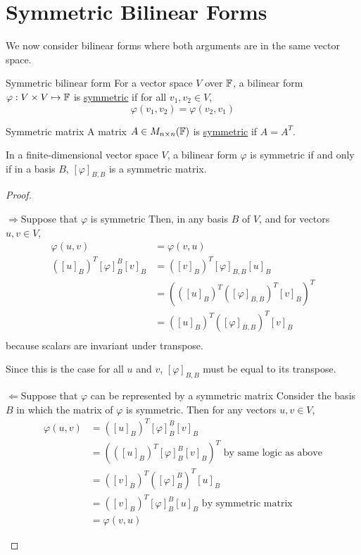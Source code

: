 \documentclass[../Main.tex]{subfiles}
\begin{document}
\section{Symmetric Bilinear Forms}
We now consider bilinear forms where both arguments are in the same vector space.
\begin{definition}{Symmetric bilinear form}
    For a vector space $V$ over $\mathbb{F}$, a bilinear form $\varphi : V \times V \mapsto \mathbb{F}$ is \underline{symmetric} if for all $v_1, v_2 \in V$,
    \begin{equation*}
        \varphi(v_1, v_2) = \varphi(v_2, v_1)
    \end{equation*}
\end{definition}
\begin{definition}{Symmetric matrix}
    A matrix $A \in M_{n \times n}(\mathbb{F})$ is \underline{symmetric} if $A = A^T$.
\end{definition}
\begin{proposition}
    In a finite-dimensional vector space $V$, a bilinear form $\varphi$ is symmetric if and only if in a basis $B$, $[\varphi]_{B, B}$ is a symmetric matrix.
    \label{propSymMatrixIffBF}
\end{proposition}
\begin{proof}
    \begin{proofdirection}{$\Rightarrow$}{Suppose that $\varphi$ is symmetric}
        Then, in any basis $B$ of $V$, and for vectors $u, v \in V$,
        \begin{align*}
            \varphi(u, v) &= \varphi(v, u) \\
            \left([u]_B\right)^T [\varphi]_B^B [v]_B &= \left([v]_B\right)^T [\varphi]_{B, B} [u]_B \\
            &= \left(\left([u]_B\right)^T \left([\varphi]_{B, B}\right)^T [v]_B\right)^T \\
            &= \left([u]_B\right)^T \left([\varphi]_{B, B}\right)^T [v]_B \\
        \end{align*}
        because scalars are invariant under transpose.

        Since this is the case for all $u$ and $v$, $[\varphi]_{B, B}$ must be equal to its transpose.
    \end{proofdirection}
    \begin{proofdirection}{$\Leftarrow$}{Suppose that $\varphi$ can be represented by a symmetric matrix}
        Consider the basis $B$ in which the matrix of $\varphi$ is symmetric. Then for any vectors $u, v \in V$,
        \begin{align*}
            \varphi(u, v) &=\left([u]_B\right)^T [\varphi]_B^B [v]_B  \\
            &= \left(\left([u]_B\right)^T [\varphi]_B^B [v]_B\right)^T \text{ by same logic as above} \\
            &= \left([v]_B\right)^T \left([\varphi]_B^B\right)^T [u]_B \\
            &= \left([v]_B\right)^T [\varphi]_B^B [u]_B \text{ by symmetric matrix} \\
            &= \varphi(v, u)
        \end{align*}
    \end{proofdirection}
\end{proof}
\end{document}

